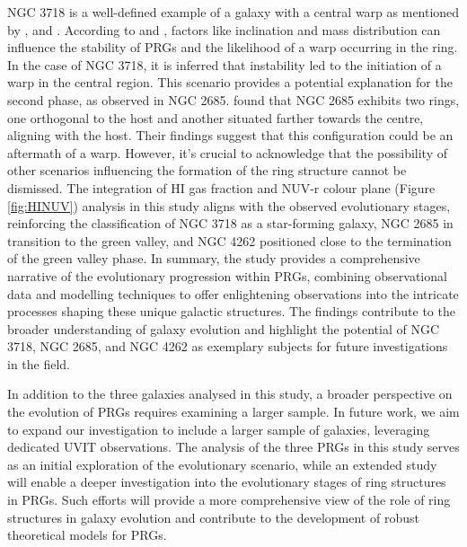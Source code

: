 \documentclass{pas}
\begin{document}
NGC 3718 is a well-defined example of a galaxy with a central warp as mentioned by \cite{1985Schwarz}, \cite{2005Krips} and \cite{2009Sparke}. According to \cite{1994Arnaboldisparke} and \cite{2003Bournaud_Combes}, factors like inclination and mass distribution can influence the stability of PRGs and the likelihood of a warp occurring in the ring. In the case of NGC 3718, it is inferred that instability led to the initiation of a warp in the central region. This scenario provides a potential explanation for the second phase, as observed in NGC 2685. \cite{2009Jozsa} found that NGC 2685 exhibits two rings, one orthogonal to the host and another situated farther towards the centre, aligning with the host. Their findings suggest that this configuration could be an aftermath of a warp. However, it's crucial to acknowledge that the possibility of other scenarios influencing the formation of the ring structure cannot be dismissed. The integration of HI gas fraction and NUV-r colour plane (Figure  \ref{fig:HINUV}) analysis in this study aligns with the observed evolutionary stages, reinforcing the classification of NGC 3718 as a star-forming galaxy, NGC 2685 in transition to the green valley, and NGC 4262 positioned close to the termination of the green valley phase. In summary, the study provides a comprehensive narrative of the evolutionary progression within PRGs, combining observational data and modelling techniques to offer enlightening observations into the intricate processes shaping these unique galactic structures. The findings contribute to the broader understanding of galaxy evolution and highlight the potential of NGC 3718, NGC 2685, and NGC 4262 as exemplary subjects for future investigations in the field.

{ In addition to the three galaxies analysed in this study, a broader perspective on the evolution of PRGs requires examining a larger sample. In future work, we aim to expand our investigation to include a larger sample of galaxies, leveraging dedicated UVIT observations. The analysis of the three PRGs in this study serves as an initial exploration of the evolutionary scenario, while an extended study will enable a deeper investigation into the evolutionary stages of ring structures in PRGs. Such efforts will provide a more comprehensive view of the role of ring structures in galaxy evolution and contribute to the development of robust theoretical models for PRGs.}
\end{document}
